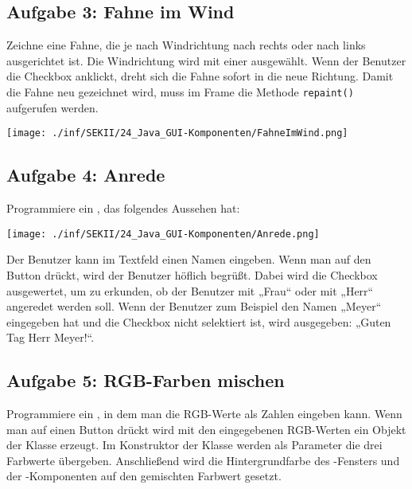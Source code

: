 \vspace{3mm}

\begin{minipage}{0.75\textwidth}
\subsection{Aufgabe 3: Fahne im Wind}

\vspace{4mm}

Zeichne eine Fahne, die je nach Windrichtung nach rechts oder nach links
ausgerichtet ist. Die Windrichtung wird mit einer 
ausgewählt. Wenn der Benutzer die Checkbox anklickt, dreht sich die Fahne sofort
in die neue Richtung. Damit die Fahne neu gezeichnet wird, muss im Frame die
Methode \lstinline|repaint()| aufgerufen werden.
\end{minipage}
\hfill
\begin{minipage}{0.25\textwidth}
\texttt{[image: ./inf/SEKII/24\_Java\_GUI-Komponenten/FahneImWind.png]}
\end{minipage}


\subsection{Aufgabe 4: Anrede}

Programmiere ein , das folgendes Aussehen hat:

\begin{center}
\texttt{[image: ./inf/SEKII/24\_Java\_GUI-Komponenten/Anrede.png]}
\end{center}

Der Benutzer kann im Textfeld einen Namen eingeben. Wenn man auf den Button
drückt, wird der Benutzer höflich begrüßt. Dabei wird die Checkbox ausgewertet,
um zu erkunden, ob der Benutzer mit „Frau“ oder mit „Herr“ angeredet werden
soll. Wenn der Benutzer zum Beispiel den Namen „Meyer“ eingegeben hat und die
Checkbox nicht selektiert ist, wird ausgegeben: „Guten Tag Herr Meyer!“.


\subsection{Aufgabe 5: RGB-Farben mischen}

Programmiere ein , in dem man die RGB-Werte als Zahlen eingeben
kann. Wenn man auf einen Button drückt wird mit den eingegebenen RGB-Werten ein
Objekt der Klasse  erzeugt. Im Konstruktor der Klasse
 werden als Parameter die drei Farbwerte übergeben. Anschließend
wird die Hintergrundfarbe des -Fensters und der
-Komponenten auf den gemischten Farbwert gesetzt.

